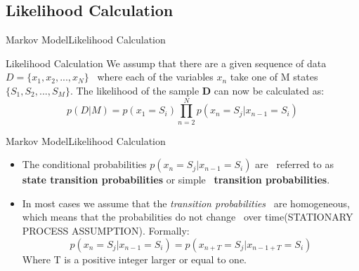 \documentclass[10pt]{beamer}
\begin{document}
\subsection{Likelihood Calculation}
\begin{frame}{Markov Model}{Likelihood Calculation}
  \begin{block}{Likelihood Calculation}
  We assump that there are a given sequence of data $D=\{x_1, x_2, ..., x_N\}$ \
  where each of the variables $x_n$ take one of M states $\{S_1, S_2, ..., S_M\}$.
  The likelihood of the sample \textbf{D} can now be calculated as:\\
        \begin{equation}
            p(D|M) = p(x_1 = S_i)\displaystyle \prod_{n=2}^{N}p(x_n = S_j | x_{n-1} = S_i)
        \end{equation}
  \end{block}
\end{frame}

\begin{frame}{Markov Model}{Likelihood Calculation}
  \begin{itemize}
    \item The conditional probabilities $p(x_n = S_j | x_{n-1} = S_i)$ are \
          referred to as \textbf{state transition probabilities} or simple \
          \textbf{transition probabilities}. \cite{Anders}
    \item In most cases we assume that the \textit{transition probabilities} \
          are homogeneous, which means that the probabilities do not change \
          over time(STATIONARY PROCESS ASSUMPTION). \cite{Anders} Formally:
          \begin{equation}
               p(x_n = S_j|x_{n-1} = S_i) = p(x_{n+T} = S_j|x_{n-1+T} = S_i)
          \end{equation}
          Where T is a positive integer larger or equal to one.
  \end{itemize}
\end{frame}

\end{document}
